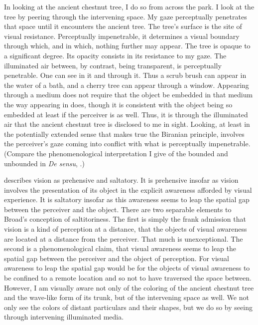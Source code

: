 In looking at the ancient chestnut tree, I do so from across the park. I look at the tree by peering through the intervening space. My gaze perceptually penetrates that space until it encounters the ancient tree. The tree's surface is the site of visual resistance. Perceptually impenetrable, it determines a visual boundary through which, and in which, nothing further may appear. The tree is opaque to a significant degree. Its opacity consists in its resistance to my gaze. The illuminated air between, by contrast, being transparent, is perceptually penetrable. One can see in it and through it. Thus a scrub brush can appear in the water of a bath, and a cherry tree can appear through a window. Appearing through a medium does not require that the object be embedded in that medium the way appearing in does, though it is consistent with the object being so embedded at least if the perceiver is as well. Thus, it is through the illuminated air that the ancient chestnut tree is disclosed to me in sight. Looking, at least in the potentially extended sense that makes true the Biranian principle, involves the perceiver's gaze coming into conflict with what is perceptually impenetrable. (Compare the phenomenological interpretation I give of the bounded and unbounded in \emph{De sensu}, \citealt[chapter 3.3]{Kalderon:2015fr}.)

\citet{Broad:1952kx} describes vision as prehensive and saltatory. It is prehensive insofar as vision involves the presentation of its object in the explicit awareness afforded by visual experience. It is saltatory insofar as this awareness seems to leap the spatial gap between the perceiver and the object. There are two separable elements to Broad's conception of saltitoriness. The first is simply the frank admission that vision is a kind of perception at a distance, that the objects of visual awareness are located at a distance from the perceiver. That much is unexceptional. The second is a phenomenological claim, that visual awareness seems to leap the spatial gap between the perceiver and the object of perception. For visual awareness to leap the spatial gap would be for the objects of visual awareness to be confined to a remote location and so not to have traversed the space between. However, I am visually aware not only of the coloring of the ancient chestnut tree and the wave-like form of its trunk, but of the intervening space as well. We not only see the colors of distant particulars and their shapes, but we do so by seeing through intervening illuminated media.

